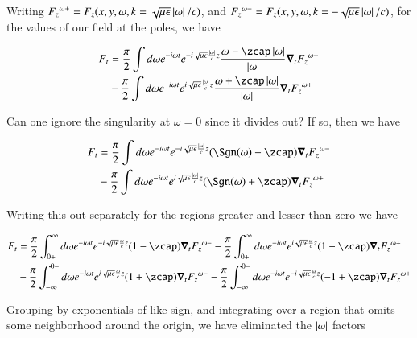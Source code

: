 Writing ${F_z}^{\omega+} = F_z(x,y,\omega, k=\sqrt{\mu\epsilon}\left\lvert{\omega}\right\rvert/c)$, and ${F_z}^{\omega-} = F_z(x,y,\omega, k=-\sqrt{\mu\epsilon}\left\lvert{\omega}\right\rvert/c)$, for the values of our field at the poles, we have

\begin{align*} %
F_t 
&= 
\frac{\pi}{2}
\int d\omega e^{-i\omega t} 
e^{-i \sqrt{\mu\epsilon}\frac{\Abs{\omega}}{c} z}
\frac{\omega -\zcap\Abs{\omega}}{\Abs{\omega}}
\spacegrad_t {F_z}^{\omega-} \\
&
- 
\frac{\pi}{2}
\int d\omega e^{-i\omega t} 
e^{i \sqrt{\mu\epsilon}\frac{\Abs{\omega}}{c} z} 
\frac{\omega +\zcap\Abs{\omega}}{\Abs{\omega}}
\spacegrad_t {F_z}^{\omega+}
\end{align*}

Can one ignore the singularity at $\omega = 0$ since it divides out?  If so, then we have

\begin{align*} %
F_t 
&= 
\frac{\pi}{2}
\int d\omega e^{-i\omega t} 
e^{-i \sqrt{\mu\epsilon}\frac{\Abs{\omega}}{c} z}
(\Sgn(\omega) - \zcap)
\spacegrad_t {F_z}^{\omega-} \\
&
- 
\frac{\pi}{2}
\int d\omega e^{-i\omega t} 
e^{i \sqrt{\mu\epsilon}\frac{\Abs{\omega}}{c} z} 
(\Sgn(\omega) + \zcap)
\spacegrad_t {F_z}^{\omega+}
\end{align*}

Writing this out separately for the regions greater and lesser than zero we have

\begin{align*} %
F_t 
&= 
\frac{\pi}{2}
\int_{0+}^\infty d\omega e^{-i\omega t} 
e^{-i \sqrt{\mu\epsilon}\frac{\omega}{c} z}
(1 - \zcap)
\spacegrad_t {F_z}^{\omega-} 
- 
\frac{\pi}{2}
\int_{0+}^\infty d\omega e^{-i\omega t} 
e^{i \sqrt{\mu\epsilon}\frac{\omega}{c} z} 
(1 + \zcap)
\spacegrad_t {F_z}^{\omega+} \\
&- 
\frac{\pi}{2}
\int_{-\infty}^{0-} d\omega e^{-i\omega t} 
e^{i \sqrt{\mu\epsilon}\frac{\omega}{c} z}
(1 + \zcap)
\spacegrad_t {F_z}^{\omega-} 
- 
\frac{\pi}{2}
\int_{-\infty}^{0-} d\omega e^{-i\omega t} 
e^{-i \sqrt{\mu\epsilon}\frac{\omega}{c} z} 
(-1 + \zcap)
\spacegrad_t {F_z}^{\omega+} \\
\end{align*}

Grouping by exponentials of like sign, and integrating over a region that omits some neighborhood around the origin, we have eliminated the $\left\lvert{\omega}\right\rvert$ factors

